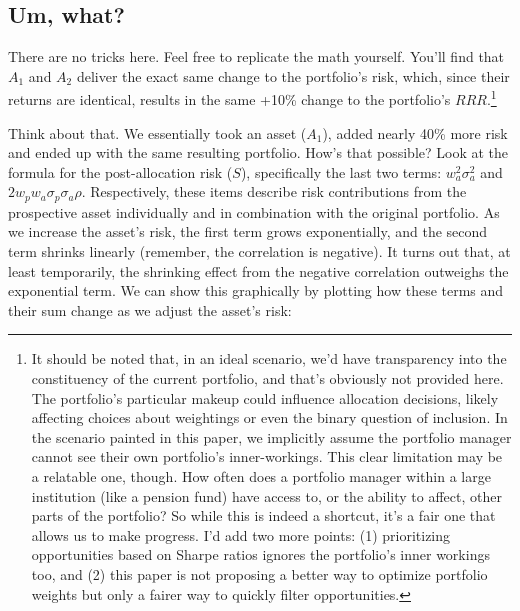 \documentclass[]{article}
\let\rmarkdownfootnote\footnote%
\def\footnote{\protect\rmarkdownfootnote}
\begin{document}
\hypertarget{um-what}{%
\subsection{Um, what?}\label{um-what}}

There are no tricks here. Feel free to replicate the math yourself.
You'll find that \(A_1\) and \(A_2\) deliver the exact same change to
the portfolio's risk, which, since their returns are identical, results
in the same +10\% change to the portfolio's \(RRR\).\footnote{It should
  be noted that, in an ideal scenario, we'd have transparency into the
  constituency of the current portfolio, and that's obviously not
  provided here. The portfolio's particular makeup could influence
  allocation decisions, likely affecting choices about weightings or
  even the binary question of inclusion. In the scenario painted in this
  paper, we implicitly assume the portfolio manager cannot see their own
  portfolio's inner-workings. This clear limitation may be a relatable
  one, though. How often does a portfolio manager within a large
  institution (like a pension fund) have access to, or the ability to
  affect, other parts of the portfolio? So while this is indeed a
  shortcut, it's a fair one that allows us to make progress. I'd add two
  more points: (1) prioritizing opportunities based on Sharpe ratios
  ignores the portfolio's inner workings too, and (2) this paper is not
  proposing a better way to optimize portfolio weights but only a fairer
  way to quickly filter opportunities.}

Think about that. We essentially took an asset (\(A_1\)), added nearly
40\% more risk and ended up with the same resulting portfolio. How's
that possible? Look at the formula for the post-allocation risk (\(S\)),
specifically the last two terms: \(w_a^2 \sigma_a^2\) and
\(2 w_p w_a \sigma_p \sigma_a \rho\). Respectively, these items describe
risk contributions from the prospective asset individually and in
combination with the original portfolio. As we increase the asset's
risk, the first term grows exponentially, and the second term shrinks
linearly (remember, the correlation is negative). It turns out that, at
least temporarily, the shrinking effect from the negative correlation
outweighs the exponential term. We can show this graphically by plotting
how these terms and their sum change as we adjust the asset's risk:
\end{document}
